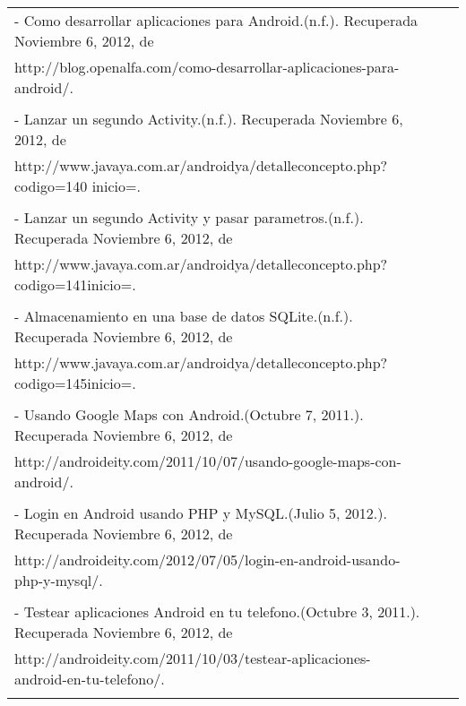 \documentclass[letterpaper,11pt]{article}
\begin{document}
\begin{tabular}{lll}

- Como desarrollar aplicaciones para Android.(n.f.). Recuperada Noviembre 6, 2012, de \\
http://blog.openalfa.com/como-desarrollar-aplicaciones-para-android/.\\\\
- Lanzar un segundo Activity.(n.f.). Recuperada Noviembre 6, 2012, de \\
http://www.javaya.com.ar/androidya/detalleconcepto.php?codigo=140 inicio=.\\\\
- Lanzar un segundo Activity y pasar parametros.(n.f.). Recuperada Noviembre 6, 2012, de \\
http://www.javaya.com.ar/androidya/detalleconcepto.php?codigo=141inicio=.\\\\
- Almacenamiento en una base de datos SQLite.(n.f.). Recuperada Noviembre 6, 2012, de \\
http://www.javaya.com.ar/androidya/detalleconcepto.php?codigo=145inicio=.\\\\
- Usando Google Maps con Android.(Octubre 7, 2011.). Recuperada Noviembre 6, 2012, de \\
http://androideity.com/2011/10/07/usando-google-maps-con-android/.\\\\
- Login en Android usando PHP y MySQL.(Julio 5, 2012.). Recuperada Noviembre 6, 2012, de \\
http://androideity.com/2012/07/05/login-en-android-usando-php-y-mysql/.\\\\
- Testear aplicaciones Android en tu telefono.(Octubre 3, 2011.). Recuperada Noviembre 6, 2012, de \\
http://androideity.com/2011/10/03/testear-aplicaciones-android-en-tu-telefono/.\\\\
\end{tabular}
\end{document}
